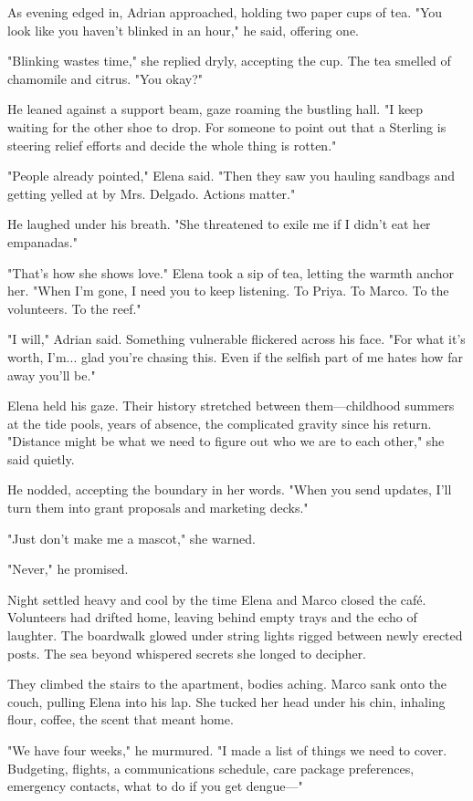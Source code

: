 As evening edged in, Adrian approached, holding two paper cups of tea. "You look like you haven't blinked in an hour," he said, offering one.

"Blinking wastes time," she replied dryly, accepting the cup. The tea smelled of chamomile and citrus. "You okay?"

He leaned against a support beam, gaze roaming the bustling hall. "I keep waiting for the other shoe to drop. For someone to point out that a Sterling is steering relief efforts and decide the whole thing is rotten."

"People already pointed," Elena said. "Then they saw you hauling sandbags and getting yelled at by Mrs. Delgado. Actions matter."

He laughed under his breath. "She threatened to exile me if I didn't eat her empanadas."

"That's how she shows love." Elena took a sip of tea, letting the warmth anchor her. "When I'm gone, I need you to keep listening. To Priya. To Marco. To the volunteers. To the reef."

"I will," Adrian said. Something vulnerable flickered across his face. "For what it's worth, I'm... glad you're chasing this. Even if the selfish part of me hates how far away you'll be."

Elena held his gaze. Their history stretched between them—childhood summers at the tide pools, years of absence, the complicated gravity since his return. "Distance might be what we need to figure out who we are to each other," she said quietly.

He nodded, accepting the boundary in her words. "When you send updates, I'll turn them into grant proposals and marketing decks."

"Just don't make me a mascot," she warned.

"Never," he promised.

\bigskip

Night settled heavy and cool by the time Elena and Marco closed the café. Volunteers had drifted home, leaving behind empty trays and the echo of laughter. The boardwalk glowed under string lights rigged between newly erected posts. The sea beyond whispered secrets she longed to decipher.

They climbed the stairs to the apartment, bodies aching. Marco sank onto the couch, pulling Elena into his lap. She tucked her head under his chin, inhaling flour, coffee, the scent that meant home.

"We have four weeks," he murmured. "I made a list of things we need to cover. Budgeting, flights, a communications schedule, care package preferences, emergency contacts, what to do if you get dengue—"

